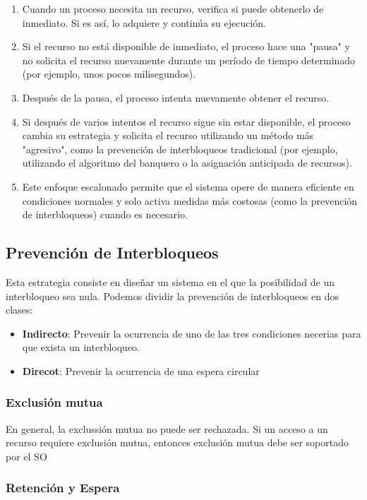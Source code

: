 \documentclass[12pt, a4paper]{article} %
\begin{document}
\begin{enumerate}
	\item Cuando un proceso necesita un recurso, verifica si puede obtenerlo de inmediato. Si es así, lo adquiere y continúa su ejecución.
	\item Si el recurso no está disponible de inmediato, el proceso hace una "pausa" y no solicita el recurso nuevamente durante un período de tiempo determinado (por ejemplo, unos pocos milisegundos).
	\item Después de la pausa, el proceso intenta nuevamente obtener el recurso.
	\item Si después de varios intentos el recurso sigue sin estar disponible, el proceso cambia su estrategia y solicita el recurso utilizando un método más "agresivo", como la prevención de interbloqueos tradicional (por ejemplo, utilizando el algoritmo del banquero o la asignación anticipada de recursos).
	\item Este enfoque escalonado permite que el sistema opere de manera eficiente en condiciones normales y solo activa medidas más costosas (como la prevención de interbloqueos) cuando es necesario.
\end{enumerate}

\subsection{Prevención de Interbloqueos}

Esta estrategia consiste en diseñar un sistema en el que la posibilidad de un interbloqueo sea nula. Podemos dividir la prevención de interbloqueos en dos clases:

\begin{itemize}
	\item \textbf{Indirecto}: Prevenir la ocurrencia de uno de las tres condiciones necerias para que exista un interbloqueo.
	\item \textbf{Direcot}: Prevenir la ocurrencia de una espera circular
\end{itemize}

\subsubsection{Exclusión mutua}

En general, la exclussión mutua no puede ser rechazada. Si un acceso a un recurso requiere exclusión mutua, entonces exclusión mutua debe ser soportado por el SO

\subsubsection{Retención y Espera}
\end{document}
